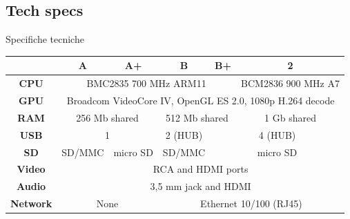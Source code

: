 \documentclass[xcolor=svgnames,11pt]{beamer}
\begin{document}
\subsection{Tech specs}
\begin{frame}[fragile]{Specifiche tecniche}
\begin{center}
\begin{tabular}{|c|c|c|c|c|c|}
\hline
 & \textbf{A} & \textbf{A+} & \textbf{B} & \textbf{B+} & \textbf{2} \\
\hline
\textbf{CPU} & \multicolumn{4}{c|}{{\tiny BMC2835 700 MHz ARM11}} & {\tiny BCM2836 900 MHz A7} \\
\hline
\textbf{GPU} & \multicolumn{5}{c|}{{\tiny Broadcom VideoCore IV, OpenGL ES 2.0, 1080p H.264 decode}} \\
\hline
\textbf{RAM} & \multicolumn{2}{c|}{{\tiny 256 Mb shared}} & \multicolumn{2}{c|}{{\tiny 512 Mb shared}} & {\tiny 1 Gb shared}\\
\hline
\textbf{USB} & \multicolumn{2}{c|}{{\tiny 1}} & {\tiny 2 (HUB)} & \multicolumn{2}{c|}{{\tiny 4 (HUB)}} \\
\hline
\textbf{SD} & {\tiny SD/MMC} & {\tiny micro SD} & {\tiny SD/MMC} & \multicolumn{2}{c|}{{\tiny micro SD}} \\
\hline
\textbf{Video} & \multicolumn{5}{c|}{{\tiny RCA and HDMI ports}} \\
\hline
\textbf{Audio} & \multicolumn{5}{c|}{{\tiny 3,5 mm jack and HDMI}} \\
\hline
\textbf{Network} & \multicolumn{2}{c|}{{\tiny None}} & \multicolumn{3}{c|}{{\tiny Ethernet 10/100 (RJ45)}}\\
\hline
\end{tabular}
\end{center}
\end{frame}
\end{document}
